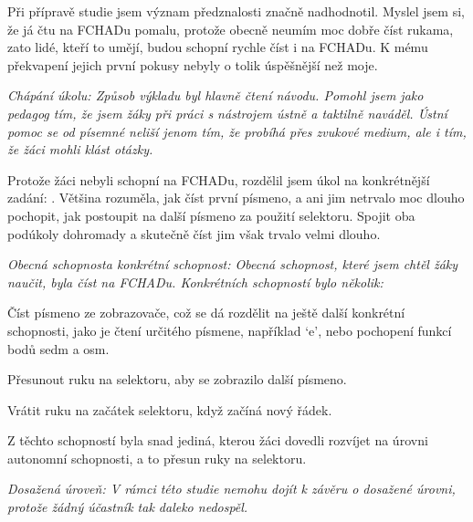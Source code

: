 Při přípravě studie jsem význam předznalosti značně nadhodnotil.  Myslel jsem si, že já čtu na FCHADu pomalu, protože obecně neumím moc dobře číst rukama, zato lidé, kteří to umějí, budou schopní rychle číst i na FCHADu.  K mému překvapení jejich první pokusy nebyly o tolik úspěšnější než moje.

\em Chápání úkolu\em : Způsob výkladu byl hlavně čtení návodu.  Pomohl jsem jako pedagog tím, že jsem žáky při práci s nástrojem ústně a taktilně naváděl.  Ústní pomoc se od písemné neliší jenom tím, že probíhá přes zvukové medium, ale i tím, že žáci mohli klást otázky.

Protože žáci nebyli schopní  na FCHADu, rozdělil jsem úkol na konkrétnější zadání: .  Většina rozuměla, jak číst první písmeno, a ani jim netrvalo moc dlouho pochopit, jak postoupit na další písmeno za použití selektoru. Spojit oba podúkoly dohromady a skutečně číst jim však trvalo velmi dlouho.

\em Obecná schopnost\em a \em konkrétní schopnost\em :  Obecná schopnost, které jsem chtěl žáky naučit, byla číst na FCHADu.  Konkrétních schopností bylo několik:

Číst písmeno ze zobrazovače, což se dá rozdělit na ještě další konkrétní schopnosti, jako je čtení určitého písmene, například `e', nebo pochopení funkcí bodů sedm a osm.

Přesunout ruku na selektoru, aby se zobrazilo další písmeno.

Vrátit ruku na začátek selektoru, když začíná nový řádek.

Z těchto schopností byla snad jediná, kterou žáci dovedli rozvíjet na úrovni autonomní schopnosti, a to přesun ruky na selektoru.

\em Dosažená úroveň\em : V rámci této studie nemohu dojít k závěru o dosažené úrovni, protože žádný účastník tak daleko nedospěl.
